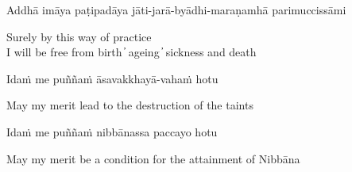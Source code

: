 Addhā imāya paṭipadāya jāti-jarā-byādhi-maraṇamhā parimuccissāmi

\begin{cprenglish}
Surely by this way of practice\\
I will be free from birth  ̓  ageing  ̓  sickness and death
\end{cprenglish}

Idaṁ me puññaṁ āsavakkhayā-vahaṁ hotu

\begin{cprenglish}
May my merit lead to the destruction of the taints
\end{cprenglish}

Idaṁ me puññaṁ nibbānassa paccayo hotu

\begin{cprenglish}
May my merit be a condition for the attainment of Nibbāna
\end{cprenglish}


\clearpage
